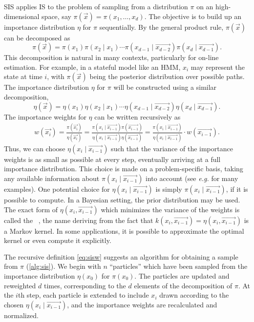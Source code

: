 \gls{SIS} applies \gls{IS} to the problem of sampling from a distribution $\pi$ 
on an high-dimensional space, say $\pi(\vec{x}) = \pi(x_1, \ldots, x_d)$. The
objective is to build up an importance distribution $\eta$ for $\pi$
sequentially. By the general product rule, $\pi(\vec{x})$ can be decomposed as
\[
  \pi(\vec{x}) 
  = \pi(x_1) \pi(x_2 \mid x_1) \cdots
    \pi(x_{d-1} \mid \vec{x_{d-2}}) \pi(x_d \mid \vec{x_{d-1}}).
\]
This decomposition is natural in many contexts, particularly for on-line
estimation. For example, in a stateful model like an \gls{HMM}, $x_i$ may
represent the state at time $i$, with $\pi(\vec{x})$ being the posterior
distribution over possible paths. The importance distribution $\eta$ for $\pi$
will be constructed using a similar decomposition,
\[
  \eta(\vec{x}) 
  = \eta(x_1) \eta(x_2 \mid x_1) \cdots
    \eta(x_{d-1} \mid \vec{x_{d-2}}) \eta(x_d \mid \vec{x_{d-1}}).
\]
The importance weights for $\eta$ can be written recursively as
\begin{align}
  \label{eq:sisw}
  w(\vec{x_i}) = \frac{\pi(\vec{x_i})}{\eta(\vec{x_i})}
  = \frac{\pi(x_i \mid \vec{x_{i-1}})\pi(\vec{x_{i-1}})}
         {\eta(x_i \mid \vec{x_{i-1}})\eta(\vec{x_{i-1}})}
  = \frac{\pi(x_i \mid \vec{x_{i-1}})}
         {\eta(x_i \mid \vec{x_{i-1}})}\cdot w(\vec{x_{i-1}}).
\end{align}
Thus, we can choose $\eta(x_i \mid \vec{x_{i-1}})$ such that the variance of
the importance weights is as small as possible at every step, eventually
arriving at a full importance distribution. This choice is made on a
problem-specific basis, taking any available information about $\pi(x_i \mid
\vec{x_{i-1}})$ into account (see \textit{e.g.}
\autocite{smith2013sequential,liu2008monte} for many examples).  One potential
choice for $\eta(x_i \mid \vec{x_{i-1}})$ is simply $\pi(x_i \mid
\vec{x_{i-1}})$, if it is possible to compute. In a Bayesian setting, the
prior distribution may be used. The exact form of $\eta(x_i, \vec{x_{i-1}})$
which minimizes the variance of the weights is called the ~\autocite{cappe2007overview}, the name deriving from the fact that
$k(x_i, \vec{x_{i-1}}) = \eta(x_i, \vec{x_{i-1}})$ is a Markov kernel. In some
applications, it is possible to approximate the optimal kernel or even compute
it explicitly.

The recursive definition \cref{eq:sisw} suggests an algorithm for obtaining a
sample from $\pi$ (\cref{alg:sis}).  We begin with $n$ ``particles'' which have
been sampled from the importance distribution $\eta(x_0)$ for $\pi(x_0)$. The
particles are updated and reweighted $d$ times, corresponding to the $d$
elements of the decomposition of $\pi$. At the $i$th step, each particle is
extended to include $x_i$ drawn according to the chosen $\eta(x_i \mid
\vec{x_{i-1}})$, and the importance weights are recalculated and normalized. 

